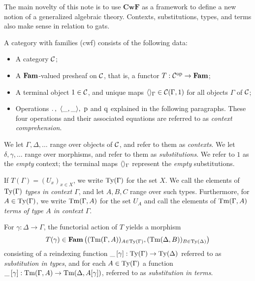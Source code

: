 \documentclass{lmcs}
\def\Cwf{\mathbf{CwF}}
\begin{document}
The main novelty of this note is to use $\Cwf$ as a framework
to define a new notion of a generalized algebraic theory.
Contexts, substitutions, types, and terms also make
sense in relation to gats.

\begin{definition}\label{def:Cwfobj}
A category with families (cwf) consists of the following data:

\begin{itemize}
\item A category ${\mathcal C}$;

\item A $\textbf{Fam}$-valued presheaf on ${\mathcal C}$, that is, a functor
$T : {\mathcal C}^{\text{op}} \to \textbf{Fam}$;

\item A terminal object $1\in {\mathcal C}$, and unique maps
$\langle  \rangle_\Gamma \in {\mathcal C}(\Gamma, 1)$ for all objects $\Gamma$ of ${\mathcal C}$;

\item Operations ${.\,},~\langle \_,\_ \rangle,~\mathrm{p}$ and $\mathrm{q}$
explained in the following paragraphs.
These four operations and their associated equations
are referred to as \emph{context comprehension}.
\end{itemize}

We let $\Gamma, \Delta,\ldots$ range over objects of ${\mathcal C}$,
and refer to them as \emph{contexts}.
We let $\delta, \gamma,\ldots$ range over morphisms,
and refer to them as \emph{substitutions}.
We refer to $1$ as the \emph{empty} context; the terminal maps
$\langle  \rangle_\Gamma$ represent the \emph{empty} substitutions.

If $T(\Gamma) = (U_x)_{x\in X}$, we write $\mathrm{Ty}(\Gamma)$ for the set $X$.
We call the elements of $\mathrm{Ty}(\Gamma)$ \emph{types in context $\Gamma$},
and let $A, B, C$ range over such types.
Furthermore, for $A \in \mathrm{Ty}(\Gamma)$, we write $\mathrm{Tm}(\Gamma, A)$ for the set $U_A$
and call the elements of $\mathrm{Tm}(\Gamma, A)$
\emph{terms of type $A$ in context $\Gamma$}.

For $\gamma : \Delta \to \Gamma$,
the functorial action of $T$ yields a morphism
\[
T(\gamma) \in  \Fam\left((\Tm(\Gamma, A))_{A\in \Ty(\Gamma)}, %
                (\Tm(\Delta, B))_{B\in \Ty(\Delta)}\right)
\]
consisting of a reindexing function $\_\,[\gamma] : \mathrm{Ty}(\Gamma) \to
\mathrm{Ty}(\Delta)$ referred to as \emph{substitution in types}, and for each $A\in
\mathrm{Ty}(\Gamma)$ a function $\_\,[\gamma] : \mathrm{Tm}(\Gamma, A) \to \mathrm{Tm}(\Delta,
A[\gamma])$, referred to as \emph{substitution in terms}.


\end{definition}
\end{document}
